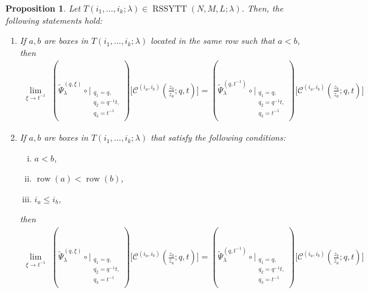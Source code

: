 \documentclass[12pt,reqno,a4paper]{amsart}
\newcommand{\comp}{\circ}
\newcommand{\cals}[1]{\mathcal{#1}}
\numberwithin{equation}{section}
\newtheorem{prop}[thm]{Proposition}
\newcommand{\dualmap}{
\widetilde{\Psi}^{(q,\xi)}_{\lambda}
}
\theoremstyle{definition}
\begin{document}
\begin{prop}
\label{a16-1103-1aug}
Let $T(i_1,\dots,i_k;\lambda) \in 
\operatorname{RSSYTT}(N,M,L;\lambda)$. Then, the following statements hold:
\begin{enumerate}[(1)]
\item \label{kor1-1027}
If $a,b$ are boxes in $T(i_1,\dots,i_k;\lambda)$ located in the same row such that $a < b$, then 
\begin{align}
	\lim_{\xi \rightarrow t^{-1}}\,\,
	(
	\dualmap
	\comp 
	\bigg|_{
		\substack{
			q_1 = q, \\
			q_2 = q^{-1}t,\\
			q_3 = t^{-1} \\
		}
	}
	)
	\Big[
	\cals{C}^{(i_a,i_b)}\left(
	\frac{z_b}{z_a}
	; q, t
	\right)
	\Big]
	=
	(
	\widetilde{\Psi}_{\lambda}^{(q,t^{-1})}
	\comp 
	\bigg|_{
		\substack{
			q_1 = q, \\
			q_2 = q^{-1}t,\\
			q_3 = t^{-1} \\
		}
	}
	)
	\Big[
	\cals{C}^{(i_a,i_b)}\left(
	\frac{z_b}{z_a}
	; q, t
	\right)
	\Big]
\end{align}
\item \label{kor2-1027}
If $a,b$ are boxes in $T(i_1,\dots,i_k;\lambda)$ that satisfy the following conditions:
\begin{enumerate}[(i)]
\item $a < b $,
\item $\operatorname{row}(a) < \operatorname{row}(b)$,
\item $i_a \leq i_b$,
\end{enumerate}
then 
\begin{align}
	\lim_{\xi \rightarrow t^{-1}}\,\,
	(
	\dualmap
	\comp 
	\bigg|_{
		\substack{
			q_1 = q, \\
			q_2 = q^{-1}t,\\
			q_3 = t^{-1} \\
		}
	}
	)
	\Big[
	\cals{C}^{(i_a,i_b)}\left(
	\frac{z_b}{z_a}
	; q, t
	\right)
	\Big]
	=
	(
	\widetilde{\Psi}_{\lambda}^{(q,t^{-1})}
	\comp 
	\bigg|_{
		\substack{
			q_1 = q, \\
			q_2 = q^{-1}t,\\
			q_3 = t^{-1} \\
		}
	}
	)
	\Big[
	\cals{C}^{(i_a,i_b)}\left(
	\frac{z_b}{z_a}
	; q, t
	\right)
	\Big]
\end{align}
\end{enumerate}
\end{prop}
\end{document}
